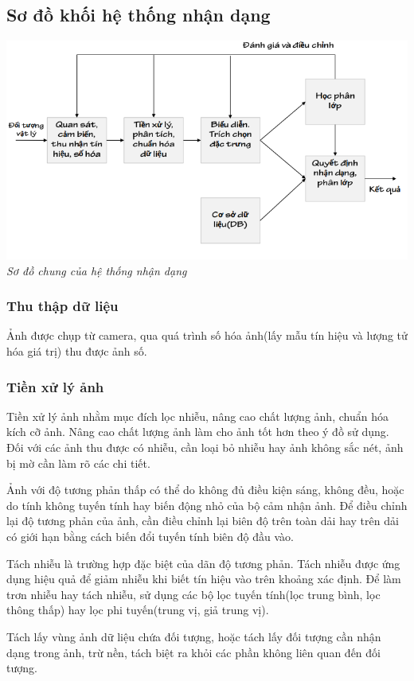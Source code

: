\documentclass[12pt,a4paper]{article}
\begin{document}
\subsection{Sơ đồ khối hệ thống nhận dạng}
\begin{center}
\includegraphics[scale=0.8]{23.png}\\
\textit{Sơ đồ chung của hệ thống nhận dạng}
\end{center}
\par 

\subsubsection{Thu thập dữ liệu}
Ảnh được chụp từ camera, qua quá trình số hóa ảnh(lấy mẫu tín hiệu và lượng tử hóa giá trị) thu được ảnh số. 
\subsubsection{Tiền xử lý ảnh}
Tiền xử lý ảnh nhằm mục đích lọc nhiễu, nâng cao chất lượng ảnh, chuẩn hóa kích cỡ ảnh. Nâng cao chất lượng ảnh làm cho ảnh tốt hơn theo ý đồ sử dụng. Đối với các ảnh thu được có nhiễu, cần loại bỏ nhiễu hay ảnh không sắc nét, ảnh bị mờ cần làm rõ các chi tiết. \par 
Ảnh với độ tương phản thấp có thể do không đủ điều kiện sáng, không đều, hoặc do tính không tuyến tính hay biến động nhỏ của bộ cảm nhận ảnh. Để điều chỉnh lại độ tương phản của ảnh, cần điều chỉnh lại biên độ trên toàn dải hay trên dải có giới hạn bằng cách biến đổi tuyến tính biên độ đầu vào. \par 
Tách nhiễu là trường hợp đặc biệt của dãn độ tương phản. Tách nhiễu được ứng dụng hiệu quả để giảm nhiễu khi biết tín hiệu vào trên khoảng xác định. Để làm trơn nhiễu hay tách nhiễu, sử dụng các bộ lọc tuyến tính(lọc trung bình, lọc thông thấp) hay lọc phi tuyến(trung vị, giả trung vị). \par 
Tách lấy vùng ảnh dữ liệu chứa đối tượng, hoặc tách lấy đối tượng cần nhận dạng trong ảnh, trừ nền, tách biệt ra khỏi các phần không liên quan đến đối tượng. 
\end{document}
